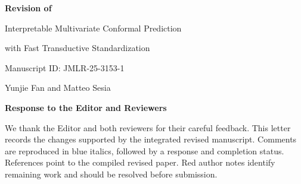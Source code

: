 \documentclass[11pt]{article}
\begin{document}
\begin{center}
{\Large\bfseries Revision of\par
Interpretable Multivariate Conformal Prediction\par
with Fast Transductive Standardization\par}
\vspace{0.7em}
Manuscript ID: JMLR-25-3153-1\par
Yunjie Fan and Matteo Sesia\par
\vspace{0.5em}
{\large\bfseries Response to the Editor and Reviewers}
\end{center}
We thank the Editor and both reviewers for their careful feedback. This letter
records the changes supported by the integrated revised manuscript. Comments
are reproduced in blue italics, followed by a response and completion status.
References point to the compiled revised paper. Red author notes identify
remaining work and should be resolved before submission.
\end{document}
